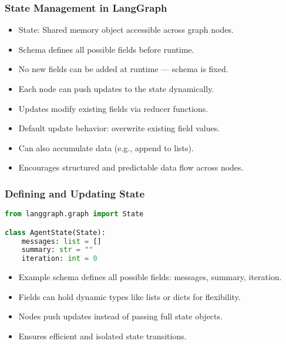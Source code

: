 \begin{frame}[fragile]\frametitle{State Management in LangGraph}
      \begin{itemize}
        \item State: Shared memory object accessible across graph nodes.
        \item Schema defines all possible fields before runtime.
        \item No new fields can be added at runtime — schema is fixed.
        \item Each node can push updates to the state dynamically.
        \item Updates modify existing fields via reducer functions.
        \item Default update behavior: overwrite existing field values.
        \item Can also accumulate data (e.g., append to lists).
        \item Encourages structured and predictable data flow across nodes.
      \end{itemize}
\end{frame}

\begin{frame}[fragile]\frametitle{Defining and Updating State}
\begin{lstlisting}[language=Python]
from langgraph.graph import State

class AgentState(State):
    messages: list = []
    summary: str = ""
    iteration: int = 0
\end{lstlisting}

\begin{itemize}
  \item Example schema defines all possible fields: messages, summary, iteration.
  \item Fields can hold dynamic types like lists or dicts for flexibility.
  \item Nodes push updates instead of passing full state objects.
  \item Ensures efficient and isolated state transitions.
\end{itemize}
\end{frame}

